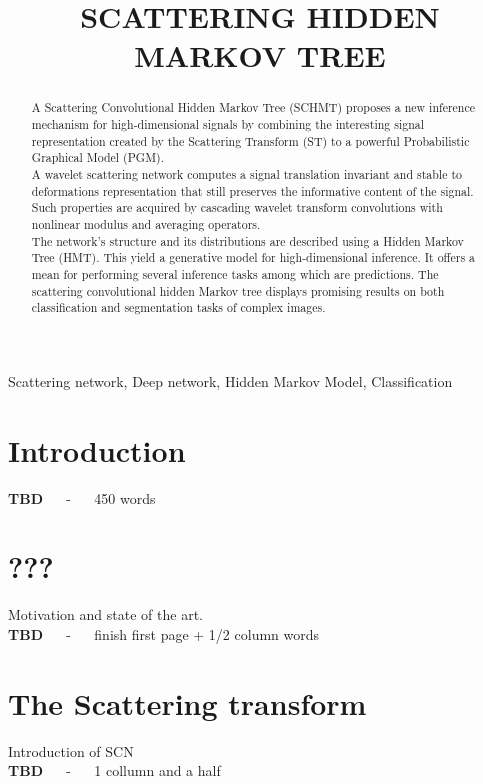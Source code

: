 \documentclass{article}
\title{SCATTERING HIDDEN MARKOV TREE}
\begin{document}
%
\maketitle
%
\begin{abstract}
A Scattering Convolutional Hidden Markov Tree (SCHMT) proposes a new inference mechanism for high-dimensional signals by combining the interesting signal representation created by the Scattering Transform (ST) to a powerful Probabilistic Graphical Model (PGM). \\
A wavelet scattering network computes a signal translation invariant and  stable to deformations representation that still preserves the informative content of the signal. Such properties are acquired by cascading wavelet transform convolutions with nonlinear modulus and averaging operators.\\
The network's structure and its distributions are described using a Hidden Markov Tree (HMT). This yield a generative model for high-dimensional inference. It offers a mean for performing several inference tasks among which are predictions. The scattering convolutional hidden Markov tree displays promising results on both classification and segmentation tasks of complex images.
\end{abstract}
%
\begin{keywords}
Scattering network, Deep network, Hidden Markov Model, Classification
\end{keywords}
%
\section{Introduction}
\label{sec:intro}

\textbf{TBD} $\quad$ - $\quad$ 450 words


\section{???}
\label{sec:format}

Motivation and state of the art. \\
\textbf{TBD} $\quad$ - $\quad$ finish first page + 1/2 column words


\section{The Scattering transform}
\label{sec:pagestyle}

  Introduction of SCN \\
  \textbf{TBD} $\quad$ - $\quad$ 1 collumn and a half
\end{document}
